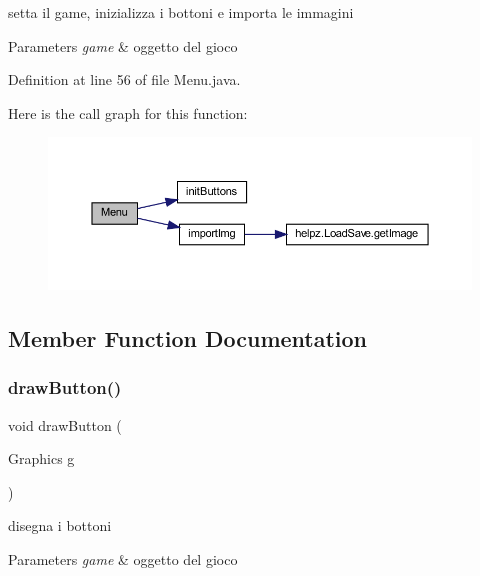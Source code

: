 setta il game, inizializza i bottoni e importa le immagini 


\begin{DoxyParams}{Parameters}
{\em game} & oggetto del gioco \\
\hline
\end{DoxyParams}


Definition at line 56 of file Menu.\+java.

Here is the call graph for this function\+:\nopagebreak
\begin{figure}[H]
\begin{center}
\leavevmode
\includegraphics[width=350pt]{classscenes_1_1_menu_aa568425829ee847c6c97c418516a3c81_cgraph}
\end{center}
\end{figure}


\subsection{Member Function Documentation}
\mbox{\label{classscenes_1_1_menu_a65768678909bc0512c6cb9780709ad38}} 
\subsubsection{\texorpdfstring{draw\+Button()}{drawButton()}}
{\footnotesize\ttfamily void draw\+Button (\begin{DoxyParamCaption}\item[{Graphics}]{g }\end{DoxyParamCaption})\hspace{0.3cm}{\ttfamily [private]}}



disegna i bottoni 


\begin{DoxyParams}{Parameters}
{\em game} & oggetto del gioco \\
\hline
\end{DoxyParams}



